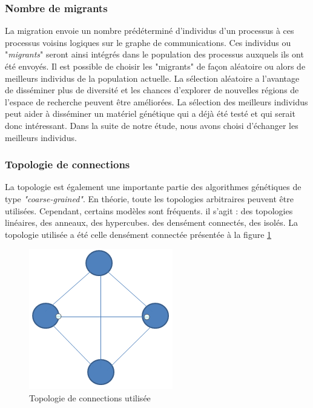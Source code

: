 \documentclass[12pt,a4paper]{article}
\begin{document}
	\subsubsection{Nombre de migrants}
	La migration envoie un nombre prédéterminé d'individus d'un processus à ces processus voisins logiques sur le graphe de communications. Ces individus ou "\emph{migrants}" seront ainsi intégrés dans le population des processus auxquels ils ont été envoyés. Il est possible de choisir les "migrants" de façon aléatoire ou alors de meilleurs individus de la population actuelle. La sélection aléatoire a l'avantage de disséminer plus de diversité et les chances d'explorer de nouvelles régions de l'espace de recherche peuvent être améliorées. La sélection des meilleurs individus peut aider à disséminer un matériel génétique qui a déjà été testé et qui serait donc intéressant. Dans la suite de notre étude, nous avons choisi d'échanger les meilleurs individus.
	\subsubsection{Topologie de connections}
	La topologie est également une importante partie des algorithmes génétiques de type \emph{"coarse-grained"}. En théorie, toute les topologies arbitraires peuvent être utilisées. Cependant, certains modèles sont fréquents. il s'agit : des topologies linéaires, des anneaux, des hypercubes. des densément connectés, des isolés. La topologie utilisée a été celle densément connectée présentée à la figure \ref{fig:topology_fig} 
	
	\begin{figure}[!h]
		\begin{center}
			\includegraphics[scale=.3]{img/topology_fig.png}
			\caption{Topologie de connections utilisée}
			\label{fig:topology_fig}
		\end{center}
	\end{figure}
	
\end{document}
